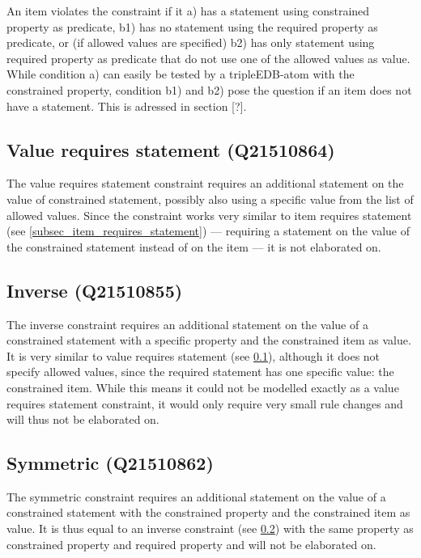 \documentclass[hyperref,bachelorofscience]{cgvpub}
\begin{document}
An item violates the constraint if it a) has a statement using constrained property as predicate, b1) has no statement using the required property as predicate, or (if allowed values are specified) b2) has only statement using required property as predicate that do not use one of the allowed values as value.\\
While condition a) can easily be tested by a tripleEDB-atom with the constrained property, condition b1) and b2) pose the question if an item does not have a statement. This is adressed in section [?].

\subsection{Value requires statement (Q21510864)}\label{subsec_value_requires_statement}
The value requires statement constraint requires an additional statement on the value of constrained statement, possibly also using a specific value from the list of allowed values. Since the constraint works very similar to item requires statement (see \ref{subsec_item_requires_statement}) --- requiring a statement on the value of the constrained statement instead of on the item --- it is not elaborated on.

\subsection{Inverse (Q21510855)}\label{subsec_inverse}
The inverse constraint requires an additional statement on the value of a constrained statement with a specific property and the constrained item as value. It is very similar to value requires statement (see \ref{subsec_value_requires_statement}), although it does not specify allowed values, since the required statement has one specific value: the constrained item. While this means it could not be modelled exactly as a value requires statement constraint, it would only require very small rule changes and will thus not be elaborated on.

\subsection{Symmetric (Q21510862)}
The symmetric constraint requires an additional statement on the value of a constrained statement with the constrained property and the constrained item as value. It is thus equal to an inverse constraint (see \ref{subsec_inverse}) with the same property as constrained property and required property and will not be elaborated on.
\end{document}
